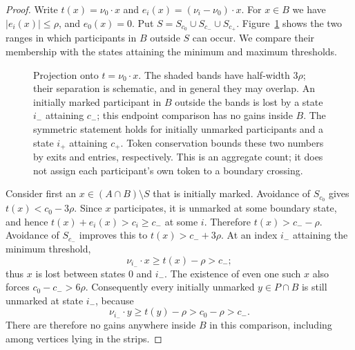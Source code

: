 \begin{proof}
Write $t(x)=\nu_0\cdot x$ and
$e_i(x)=(\nu_i-\nu_0)\cdot x$. For $x\in B$ we have
$|e_i(x)|\leq\rho$, and $e_0(x)=0$. Put
$S=S_{c_0}\cup S_{c_-}\cup S_{c_+}$.
Figure~\ref{fig:three-strip-projection} shows the two ranges in which
participants in $B$ outside $S$ can occur. We compare their membership with
the states attaining the minimum and maximum thresholds.

\begin{figure}[htbp]
\centering
{}
\caption{Projection onto $t=\nu_0\cdot x$. The shaded bands have
half-width $3\rho$; their separation is schematic, and in general they
may overlap. An initially marked participant in $B$ outside the bands is lost
by a state $i_-$ attaining $c_-$; this endpoint comparison has no gains
inside $B$.
The symmetric statement holds for initially unmarked participants and
a state $i_+$ attaining $c_+$. Token conservation bounds these two
numbers by exits and entries, respectively. This is an aggregate count;
it does not assign each participant's own token to a boundary crossing.}
\label{fig:three-strip-projection}
\end{figure}

Consider first an $x\in(A\cap B)\setminus S$ that is initially marked.
Avoidance of $S_{c_0}$ gives $t(x)<c_0-3\rho$. Since $x$ participates,
it is unmarked at some boundary state, and hence
$t(x)+e_i(x)>c_i\geq c_-$ at some $i$. Therefore
$t(x)>c_- -\rho$. Avoidance of $S_{c_-}$ improves this to
$t(x)>c_-+3\rho$. At an index $i_-$ attaining the minimum threshold,
\[
 \nu_{i_-}\cdot x\geq t(x)-\rho>c_-;
\]
thus $x$ is lost between states $0$ and $i_-$. The existence of even one
such $x$ also forces $c_0-c_->6\rho$. Consequently every initially
unmarked $y\in P\cap B$ is still unmarked at state $i_-$, because
\[
 \nu_{i_-}\cdot y\geq t(y)-\rho>c_0-\rho>c_-.
\]
There are therefore no gains anywhere inside $B$ in this comparison,
including among vertices lying in the strips.


\end{proof}
